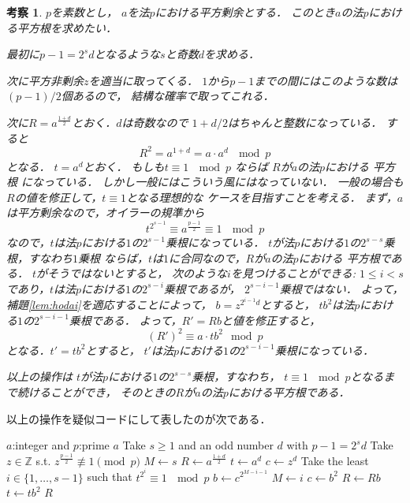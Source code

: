 \documentclass[leqno]{jsarticle}
\newtheorem{kou}[thm]{考察}
\newcommand{\zz}{\mathbb{Z}}
\begin{document}
\begin{kou}
$p$を素数とし，
$a$を法$p$における平方剰余とする．
このとき$a$の法$p$における平方根を求めたい．

最初に$p-1=2^{s}d$となるような$s$と奇数$d$を求める．

次に平方非剰余$z$を適当に取ってくる．
$1$から$p-1$までの間にはこのような数は$(p-1)/2$個あるので，
結構な確率で取ってこれる．

次に$R=a^{\frac{1+d}{2}}$とおく．$d$は奇数なので
$1+d/2$はちゃんと整数になっている．
すると
\[
R^2=a^{1+d}=a\cdot a^{d}\ \mod p
\]
となる．
$t=a^d$とおく．
もしも$t\equiv 1\  \mod p$
ならば
$R$が$a$の法$p$における
平方根
になっている．
しかし一般にはこういう風にはなっていない．
一般の場合も$R$の値を修正して，$t\equiv 1$となる理想的な
ケースを目指すことを考える．
まず，$a$は平方剰余なので，オイラーの規準から
\[
t^{2^{s-1}}\equiv a^{\frac{p-1}{2}}\equiv 1\ \mod p
\]
なので，$t$は法$p$における$1$の$2^{s-1}$乗根になっている．
$t$が法$p$における$1$の$2^{s-s}$乗根，すなわち$1$乗根
ならば，$t$は$1$に合同なので，$R$が$a$の法$p$における
平方根である．
$t$がそうではないとすると，
次のような$i$を見つけることができる:
$1\le i<s$であり，$t$は法$p$における$1$の$2^{s-i}$乗根であるが，
$2^{s-i-1}$乗根ではない．
よって，補題\ref{lem:hodai}を適応することによって，
$b=z^{2^{i-1}d}$とすると，
$tb^{2}$は法$p$における$1$の$2^{s-i-1}$乗根である．
よって，$R'=Rb$と値を修正すると，
\[
(R')^2\equiv a\cdot tb^2 \mod p
\]
となる．$t'=tb^2$とすると，
$t'$は法$p$における$1$の$2^{s-i-1}$乗根になっている．


以上の操作は
$t$が法$p$における$1$の$2^{s-s}$乗根，すなわち，
$t\equiv 1\ \mod p$となるまで続けることができ，
そのときの$R$が$a$の法$p$における平方根である．

\end{kou}
\newpage 
以上の操作を疑似コードにして表したのが次である．
\begin{algorithm}
\caption{Solving $x^2\equiv a\ \mod p$}
\begin{algorithmic}
\REQUIRE $a$:integer and $p$:prime 
\RETURN $a$
\ENDIF
\STATE Take $s\ge 1$ and an odd number $d$ 
with $p-1=2^sd$ 
\STATE Take  $z\in \zz$ s.t. $z^{\frac{p-1}{2}}\not\equiv 1\pmod{p}$
\STATE $M\gets s$
\STATE $R\gets a^{\frac{1+d}{2}}$
\STATE $t\gets a^{d}$
\STATE $c\gets z^d$
\STATE Take the least $i\in \{1, \dots, s-1\}$ such that 
$t^{2^{i}}\equiv 1\ \mod p$
\STATE $b\gets c^{2^{M-i-1}}$ 
\STATE $M\gets i$
\STATE $c\gets b^2$
\STATE $R\leftarrow Rb$
\STATE  $t\leftarrow tb^2$
\ENDWHILE
\RETURN $R$
\end{algorithmic}
\end{algorithm}
\end{document}
